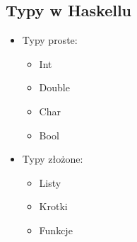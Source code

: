 \documentclass[11pt,a4paper]{article}
\begin{document}
\subsection{Typy w Haskellu}
\begin{itemize}
    \item Typy proste:
        \begin{itemize}
            \item Int
            \item Double
            \item Char
            \item Bool
        \end{itemize}
    \item Typy złożone:
        \begin{itemize}
            \item Listy
            \item Krotki
            \item Funkcje
        \end{itemize}
\end{itemize}
\end{document}
